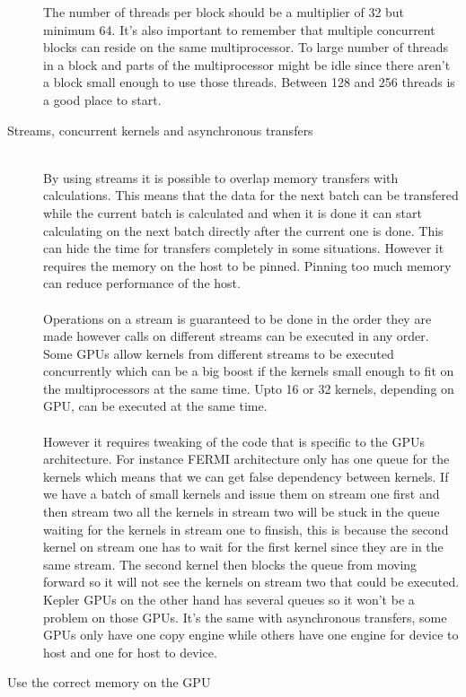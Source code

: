 \documentclass[10pt,a4paper]{article}
\begin{document}
\begin{description}
  The number of threads per block should be a multiplier of 32 but minimum 64. It's also important to remember that multiple concurrent blocks can reside on the same multiprocessor. To large number of threads in a block and parts of the multiprocessor might be idle since there aren't a block small enough to use those threads. Between 128 and 256 threads is a good place to start.\cite{cuda_best_practice}
  \item[Streams, concurrent kernels and asynchronous transfers] \hfill \\
  By using streams it is possible to overlap memory transfers with calculations. This means that the data for the next batch can be transfered while the current batch is calculated and when it is done it can start calculating on the next batch directly after the current one is done. This can hide the time for transfers completely in some situations. However it requires the memory on the host to be pinned. Pinning too much memory can reduce performance of the host.\cite{cuda}\\
  \\
  Operations on a stream is guaranteed to be done in the order they are made however calls on different streams can be executed in any order. Some GPUs allow kernels from different streams to be executed concurrently which can be a big boost if the kernels small enough to fit on the multiprocessors at the same time. Upto 16 or 32 kernels, depending on GPU, can be executed at the same time.\\
  \\
  However it requires tweaking of the code that is specific to the GPUs architecture. For instance FERMI architecture only has one queue for the kernels which means that we can get false dependency between kernels. If we have a batch of small kernels and issue them on stream one first and then stream two all the kernels in stream two will be stuck in the queue waiting for the kernels in stream one to finsish, this is because the second kernel on stream one has to wait for the first kernel since they are in the same stream. The second kernel then blocks the queue from moving forward so it will not see the kernels on stream two that could be executed. Kepler GPUs on the other hand has several queues so it won't be a problem on those GPUs. It's the same with asynchronous transfers, some GPUs only have one copy engine while others have one engine for device to host and one for host to device.\cite{cuda, overlap_transfers_cuda, kepler_tuning_guide}
  \item[Use the correct memory on the GPU] \hfill \\

\end{description}
\end{document}
